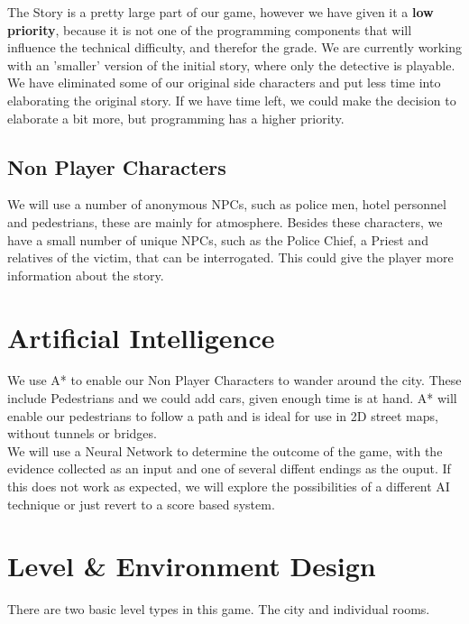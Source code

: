 \documentclass{article}
\begin{document}
		\noindent
		The Story is a pretty large part of our game, however we have given it a \textbf{low priority}, because it is not one of the programming components that will influence the technical difficulty, and therefor the grade. We are currently working with an 'smaller' version of the initial story, where only the detective is playable. We have eliminated some of our original side characters and put less time into elaborating the original story. If we have time left, we could make the decision to elaborate a bit more, but programming has a higher priority.
	\subsection*{Non Player Characters}
		We will use a number of anonymous NPCs, such as police men, hotel personnel and pedestrians, these are mainly for atmosphere. Besides these characters, we have a small number of unique NPCs, such as the Police Chief, a Priest and relatives of the victim, that can be interrogated. This could give the player more information about the story.
\section{Artificial Intelligence}
	We use A* to enable our Non Player Characters to wander around the city. These include Pedestrians and we could add cars, given enough time is at hand. A* will enable our pedestrians to follow a path and is ideal for use in 2D street maps, without tunnels or bridges.\\
	We will use a Neural Network to determine the outcome of the game, with the evidence collected as an input and one of several diffent endings as the ouput. If this does not work as expected, we will explore the possibilities of a different AI technique or just revert to a score based system.

\section{Level \& Environment Design}
	There are two basic level types in this game. The city and individual rooms.
\end{document}
